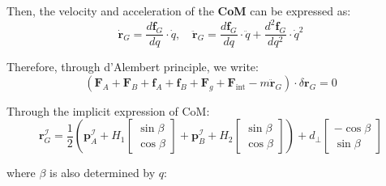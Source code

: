 \documentclass[11pt]{article}
\begin{document}
Then, the velocity and acceleration of the \textbf{CoM} can be expressed as:
\[
\dot{\mathbf{r}}_G = \frac{d \mathbf{f}_G}{dq} \cdot \dot{q}, \quad
\ddot{\mathbf{r}}_G = \frac{d \mathbf{f}_G}{dq} \cdot \ddot{q} + \frac{d^2 \mathbf{f}_G}{dq^2} \cdot \dot{q}^2
\]

Therefore, through d'Alembert principle, we write:
\[
\left( \mathbf{F}_A + \mathbf{F}_B 
+ \mathbf{f}_A + \mathbf{f}_B 
+ \mathbf{F}_g + \mathbf{F}_{\text{int}} - m\ddot{\mathbf{r}}_G \right) 
\cdot \delta \mathbf{r}_G = 0
\]

Through the implicit expression of CoM: 
\[
\mathbf{r}_G^{\mathcal{I}} = \frac{1}{2} \left( \mathbf{p}_A^{\mathcal{I}} + H_1 
\begin{bmatrix}
\sin\beta \\
\cos\beta
\end{bmatrix} + \mathbf{p}_B^{\mathcal{I}} + H_2 
\begin{bmatrix}
\sin\beta \\
\cos\beta
\end{bmatrix} \right)
+ d_\perp 
\begin{bmatrix}
- \cos\beta \\
\sin\beta
\end{bmatrix}
\]

where \(\beta\) is also determined by \(q\):









\end{document}
